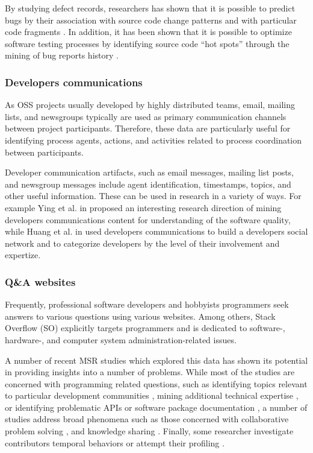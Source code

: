 By studying defect records, researchers has shown that it is possible to predict bugs by their association with source code change 
patterns \cite{citeulike:6055293} and with particular code fragments \cite{citeulike:393158}. In addition, it has been shown that
it is possible to optimize software testing processes by identifying source code ``hot spots'' through the mining of bug reports 
history \cite{ostrand2004tool}.

\subsubsection{Developers communications}
As OSS projects usually developed by highly distributed teams, email, mailing lists, and newsgroups typically are 
used as primary communication channels between project participants. Therefore, these data are particularly useful for
identifying process agents, actions,  and activities related to process coordination between participants. 

Developer communication artifacts, such as email messages, mailing list posts, and newsgroup messages include agent identification, 
timestamps, topics, and other useful information. 
These can be used in research in a variety of ways. 
For example Ying et al. in \cite{citeulike:1366052} proposed an interesting research direction of mining developers communications
content for understanding of the software quality, while Huang et al. in \cite{citeulike:9495129} used developers communications 
to build a developers social network and to categorize developers by the level of their involvement and expertize.

\subsubsection{Q\&A websites}
Frequently, professional software developers and hobbyists programmers seek answers to various questions using various websites. 
Among others, Stack Overflow (SO) explicitly targets programmers and is dedicated to software-, hardware-, and computer system 
administration-related issues.

A number of recent MSR studies which explored this data has shown its potential in providing insights into a number of problems.
While most of the studies are concerned with programming related questions, such as identifying topics relevant to particular 
development communities \cite{kartik:msr14}, mining additional technical expertise \cite{VenkataramaniGAMB13} \cite{SaxeMG13}, 
or identifying problematic APIs \cite{KavalerPGCDF13} \cite{Linares2013Exploratory} or software package documentation 
\cite{Campbell2013Deficient}, 
a number of studies address broad phenomena such as those concerned with collaborative problem solving 
\cite{Tausczik2014Collaborative}, and knowledge sharing \cite{VasilescuCSCW14} \cite{Schenk2013Geo}. 
Finally, some researcher investigate contributors temporal behaviors \cite{Bosu2013Building} or attempt their profiling 
\cite{GinscaP13}.

